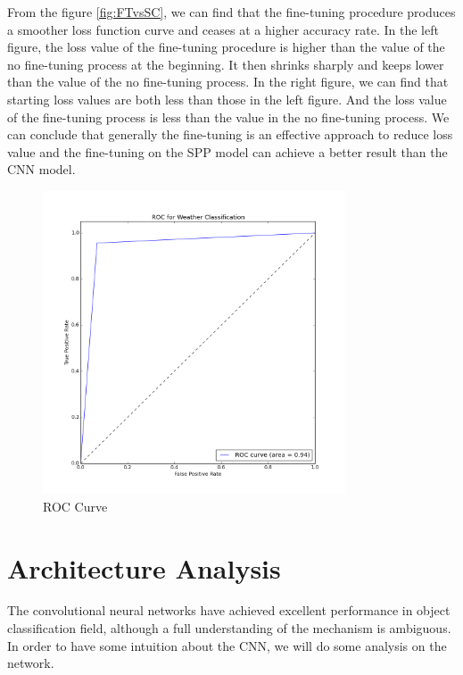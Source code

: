 From the figure \ref{fig:FTvsSC}, we can find that the fine-tuning procedure produces a smoother loss function curve and ceases at a higher accuracy rate. In the left figure, the loss value of the fine-tuning procedure is higher than the value of the no fine-tuning process at the beginning. It then shrinks sharply and keeps lower than the value of the no fine-tuning process. In the right figure, we can find that starting loss values are both less than those in the left figure. And the loss value of the fine-tuning process is less than the value in the no fine-tuning process. We can conclude that generally the fine-tuning is an effective approach to reduce loss value and the fine-tuning on the SPP model can achieve a better result than the CNN model.

\begin{figure}[!htb]
    \centering
	\includegraphics[width=0.8\textwidth]{ROCWeatherClassification.png}
    \caption{ROC Curve}%
    \label{fig:WeatherClassificationROC}%
\end{figure}

\section{Architecture Analysis}

The convolutional neural networks have achieved excellent performance in object classification field, although a full understanding of the mechanism is ambiguous. In order to have some intuition about the CNN, we will do some analysis on the network.

